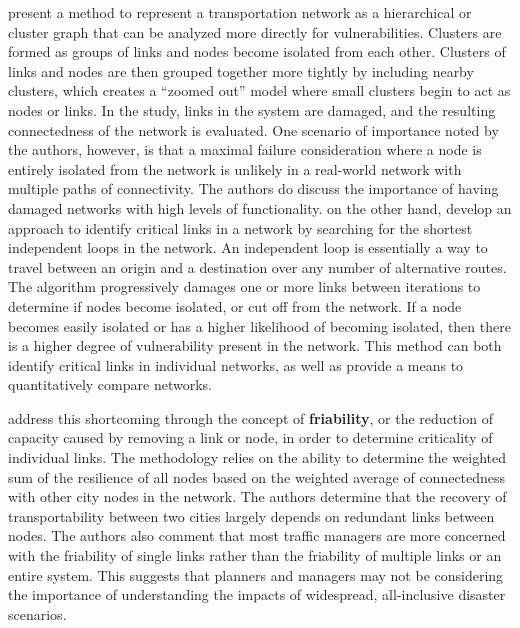 \citet{agarwal2011} present a method to represent a transportation network
as a
hierarchical or cluster graph that can be analyzed more directly for vulnerabilities. Clusters are formed as groups of links and nodes become isolated from each other. Clusters of links and nodes are then grouped together more tightly by including nearby clusters, which creates a ``zoomed out'' model where small clusters begin to act as nodes or links. In the study, links in the system are damaged, and the resulting connectedness of the network is evaluated. One scenario of importance noted by the authors, however, is that a maximal failure consideration where a
node
is entirely isolated from the network is unlikely in a real-world network
with
multiple paths of connectivity. The authors do discuss the importance of having damaged networks with high levels of functionality. \citet{vodak2019} on the other hand, develop an approach to identify
critical links in a network by searching for the shortest independent
loops in the network. An independent loop is essentially a way to travel between an origin and a destination over any number of alternative routes. The algorithm progressively damages one or more links
between iterations to determine if nodes become isolated, or cut off from
the
network. If a node becomes easily isolated or has a higher likelihood of
becoming isolated, then there is a higher degree of vulnerability present
in the
network. This method can both identify critical links in individual
networks, as
well as provide a means to quantitatively compare networks.

\citet{ip2011} address this shortcoming through the concept of
\textbf{friability}, or
the reduction of capacity caused by removing a link or node, in order to
determine criticality of individual links. The methodology relies on the
ability
to determine the weighted sum of the resilience of all nodes based on the
weighted average of connectedness with other city nodes in the network. The
authors determine that the recovery of transportability between two cities
largely depends on redundant links between nodes. The authors also comment
that
most traffic managers are more concerned with the friability of single
links
rather than the friability of multiple links or an entire system. This suggests that planners and managers may not be considering the importance of understanding the impacts of widespread, all-inclusive disaster scenarios.

